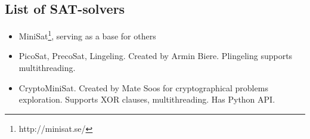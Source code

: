 \subsection{List of SAT-solvers}


\begin{itemize}

\item MiniSat\footnote{http://minisat.se/}, serving as a base for others

\item PicoSat, PrecoSat, Lingeling. Created by Armin Biere. Plingeling supports multithreading.

\item CryptoMiniSat. Created by Mate Soos for cryptographical problems exploration.
Supports XOR clauses, multithreading.
Has Python API.

\end{itemize}


